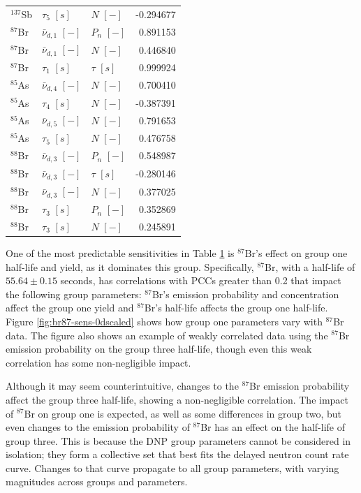 \begin{table}[!ht]
\begin{tabular}{lllr}
       $^{137}$Sb & $\tau_5$ $[s]$ & $N$ $[-]$ & -0.294677 \\
       $^{87}$Br & $\bar{\nu}_{d, 1}$ $[-]$ & $P_{n}$ $[-]$ & 0.891153 \\
       $^{87}$Br & $\bar{\nu}_{d, 1}$ $[-]$ & $N$ $[-]$ & 0.446840 \\
       $^{87}$Br & $\tau_1$ $[s]$ & $\tau$ $[s]$ & 0.999924 \\
       $^{85}$As & $\bar{\nu}_{d, 4}$ $[-]$ & $N$ $[-]$ & 0.700410 \\
       $^{85}$As & $\tau_4$ $[s]$ & $N$ $[-]$ & -0.387391 \\
       $^{85}$As & $\bar{\nu}_{d, 5}$ $[-]$ & $N$ $[-]$ & 0.791653 \\
       $^{85}$As & $\tau_5$ $[s]$ & $N$ $[-]$ & 0.476758 \\
       $^{88}$Br & $\bar{\nu}_{d, 3}$ $[-]$ & $P_{n}$ $[-]$ & 0.548987 \\
       $^{88}$Br & $\bar{\nu}_{d, 3}$ $[-]$ & $\tau$ $[s]$ & -0.280146 \\
       $^{88}$Br & $\bar{\nu}_{d, 3}$ $[-]$ & $N$ $[-]$ & 0.377025 \\
       $^{88}$Br & $\tau_3$ $[s]$ & $P_{n}$ $[-]$ & 0.352869 \\
       $^{88}$Br & $\tau_3$ $[s]$ & $N$ $[-]$ & 0.245891 \\

\hline
\end{tabular}
\label{tab:pcc-analysis}
\end{table}

One of the most predictable sensitivities in Table \ref{tab:pcc-analysis} is $^{87}$Br’s effect on group one half-life and yield, as it dominates this group.
Specifically, $^{87}$Br, with a half-life of $55.64 \pm 0.15$ seconds, has correlations with \glspl{PCC} greater than 0.2 that impact the following group parameters: $^{87}$Br's emission probability and concentration affect the group one yield and $^{87}$Br's half-life affects the group one half-life.
Figure \ref{fig:br87-sens-0dscaled} shows how group one parameters vary with $^{87}$Br data.
The figure also shows an example of weakly correlated data using the $^{87}$Br emission probability on the group three half-life, though even this weak correlation has some non-negligible impact.

Although it may seem counterintuitive, changes to the $^{87}$Br emission probability affect the group three half-life, showing a non-negligible correlation.
The impact of $^{87}$Br on group one is expected, as well as some differences in group two, but even changes to the emission probability of $^{87}$Br has an effect on the half-life of group three.
This is because the \gls{DNP} group parameters cannot be considered in isolation; they form a collective set that best fits the delayed neutron count rate curve.
Changes to that curve propagate to all group parameters, with varying magnitudes across groups and parameters.

